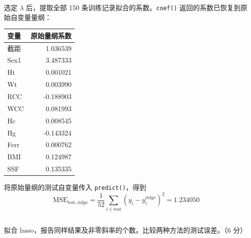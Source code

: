 \documentclass[12pt,a4paper]{article}
\begin{document}
\begin{answerbox}
选定 $\lambda$ 后，提取全部 150 条训练记录拟合的系数。\texttt{coef()} 返回的系数已恢复到原始自变量量纲：
\begin{center}
\begin{tabular}{lr}
\toprule
变量 & 原始量纲系数 \\
\midrule
截距 & 1.036539 \\
Sex1 & 3.487333 \\
Ht & 0.001021 \\
Wt & 0.003990 \\
RCC & -0.188903 \\
WCC & 0.081993 \\
Hc & 0.008545 \\
Hg & -0.143324 \\
Ferr & 0.000762 \\
BMI & 0.124987 \\
SSF & 0.135335 \\
\bottomrule
\end{tabular}
\end{center}
将原始量纲的测试自变量传入 \texttt{predict()}，得到
$$
\mathrm{MSE}_{\mathrm{test,ridge}}
=\frac{1}{52}\sum_{i\in\mathrm{test}}(y_i-\hat y_i^{\mathrm{ridge}})^2
=1.234050
$$
\end{answerbox}

\subsection{}

拟合 lasso，报告同样结果及非零斜率的个数。比较两种方法的测试误差。（6 分）
\end{document}
